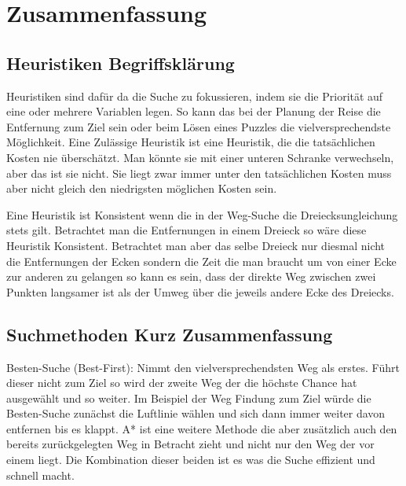 \section{Zusammenfassung}

\subsection{Heuristiken Begriffsklärung}

Heuristiken sind dafür da die Suche zu fokussieren, indem sie die Priorität auf eine oder mehrere Variablen legen. So kann das bei der Planung der Reise die Entfernung zum Ziel sein oder beim Lösen eines Puzzles die vielversprechendste Möglichkeit.
Eine Zulässige Heuristik ist eine Heuristik, die die tatsächlichen Kosten nie überschätzt. Man könnte sie mit einer unteren Schranke verwechseln, aber das ist sie nicht. Sie liegt zwar immer unter den tatsächlichen Kosten muss aber nicht gleich den niedrigsten möglichen Kosten sein.

Eine Heuristik ist Konsistent wenn die in der Weg-Suche die Dreiecksungleichung stets gilt. Betrachtet man die Entfernungen in einem Dreieck so wäre diese Heuristik Konsistent. Betrachtet man aber das selbe Dreieck nur diesmal nicht die Entfernungen der Ecken sondern die Zeit die man braucht um von einer Ecke zur anderen zu gelangen so kann es sein, dass der direkte Weg zwischen zwei Punkten langsamer ist als der Umweg über die jeweils andere Ecke des Dreiecks.

\subsection{Suchmethoden Kurz Zusammenfassung}

Besten-Suche (Best-First): Nimmt den vielversprechendsten Weg als erstes. Führt dieser nicht zum Ziel so wird der zweite Weg der die höchste Chance hat ausgewählt und so weiter. Im Beispiel der Weg Findung zum Ziel würde die Besten-Suche zunächst die Luftlinie wählen und sich dann immer weiter davon entfernen bis es klappt.
A* ist eine weitere Methode die aber zusätzlich auch den bereits zurückgelegten Weg in Betracht zieht und nicht nur den Weg der vor einem liegt.
Die Kombination dieser beiden ist es was die Suche effizient und schnell macht.
